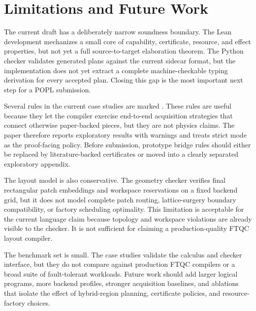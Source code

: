 \section{Limitations and Future Work}

The current draft has a deliberately narrow soundness boundary.
The Lean development mechanizes a small core of capability, certificate, resource, and effect properties, but not yet a full source-to-target elaboration theorem.
The Python checker validates generated plans against the current sidecar format, but the implementation does not yet extract a complete machine-checkable typing derivation for every accepted plan.
Closing this gap is the most important next step for a POPL submission.

Several rules in the current case studies are marked \Assumed{}.
These rules are useful because they let the compiler exercise end-to-end acquisition strategies that connect otherwise paper-backed pieces, but they are not physics claims.
The paper therefore reports exploratory results with warnings and treats strict mode as the proof-facing policy.
Before submission, prototype bridge rules should either be replaced by literature-backed certificates or moved into a clearly separated exploratory appendix.

The layout model is also conservative.
The geometry checker verifies final rectangular patch embeddings and workspace reservations on a fixed backend grid, but it does not model complete patch routing, lattice-surgery boundary compatibility, or factory scheduling optimality.
This limitation is acceptable for the current language claim because topology and workspace violations are already visible to the checker.
It is not sufficient for claiming a production-quality FTQC layout compiler.

The benchmark set is small.
The case studies validate the calculus and checker interface, but they do not compare against production FTQC compilers or a broad suite of fault-tolerant workloads.
Future work should add larger logical programs, more backend profiles, stronger acquisition baselines, and ablations that isolate the effect of hybrid-region planning, certificate policies, and resource-factory choices.

